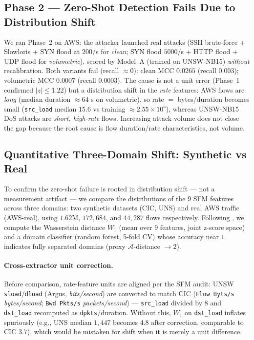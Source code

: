 \documentclass[preprint,12pt,authoryear]{elsarticle}
\begin{document}
\subsection{Phase 2 --- Zero-Shot Detection Fails Due to Distribution Shift}
\label{sec:rt-phase2}
We ran Phase~2 on AWS: the attacker launched real attacks (SSH brute-force +
Slowloris + SYN flood at $200$/s for \emph{clean}; SYN flood $5000$/s + HTTP flood
+ UDP flood for \emph{volumetric}), scored by Model~A (trained on UNSW-NB15)
\emph{without} recalibration. Both variants fail (recall $\approx 0$): clean MCC
$0.0265$ (recall $0.003$); volumetric MCC $0.0007$ (recall $0.0003$). The cause is
not a unit error (Phase~1 confirmed $|z|\le 1.22$) but a distribution shift in the
\emph{rate} features: AWS flows are \emph{long} (median duration $\approx 64$ s on
volumetric), so rate $=$ bytes/duration becomes small (\texttt{src\_load} median
$15.6$ vs training $\approx 2.55\times10^{5}$), whereas UNSW-NB15 DoS attacks are
\emph{short, high-rate} flows. Increasing attack volume does not close the gap
because the root cause is flow duration/rate characteristics, not volume.

\subsection{Quantitative Three-Domain Shift: Synthetic vs Real}
\label{sec:rt-shift}
To confirm the zero-shot failure is rooted in distribution shift --- not a
measurement artifact --- we compare the distributions of the 9 SFM features across
three domains: two synthetic datasets (CIC, UNS) and real AWS traffic (AWS-real),
using $1.62$M, $172{,}684$, and $44{,}287$ flows respectively. Following
\citet{layeghy}, we compute the Wasserstein distance $W_1$ (mean over 9 features,
joint z-score space) and a domain classifier (random forest, 5-fold CV) whose
accuracy near $1$ indicates fully separated domains (proxy
$\mathcal{A}$-distance $\to 2$).

\paragraph{Cross-extractor unit correction.} Before comparison, rate-feature units
are aligned per the SFM audit: UNSW \texttt{sload}/\texttt{dload} (Argus,
\emph{bits/second}) are converted to match CIC (\texttt{Flow Byts/s}
\emph{bytes/second}; \texttt{Bwd Pkts/s} \emph{packets/second}) --- \texttt{src\_load}
divided by $8$ and \texttt{dst\_load} recomputed as \texttt{dpkts}$/$duration.
Without this, $W_1$ on \texttt{dst\_load} inflates spuriously (e.g., UNS median
$1{,}447$ becomes $4.8$ after correction, comparable to CIC $3.7$), which would be
mistaken for shift when it is merely a unit difference.
\end{document}
